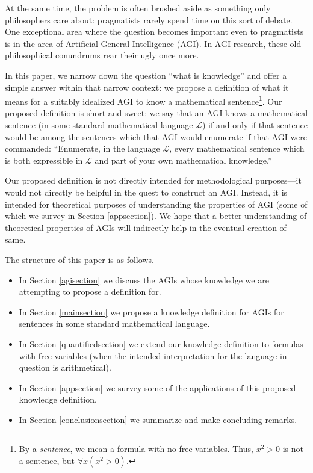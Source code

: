 \documentclass[runningheads]{llncs}
\begin{document}
At the same time, the problem is often brushed aside as something only
philosophers care about: pragmatists rarely spend time
on this sort of debate. One exceptional area where the question becomes
important even to pragmatists is in the area of Artificial General Intelligence
(AGI). In AGI research, these old philosophical conundrums rear their ugly
once more.

In this paper, we narrow down the question ``what is knowledge'' and offer
a simple answer within that narrow context:
we propose a definition of what it means for a suitably idealized AGI to know
a mathematical sentence\footnote{By a \emph{sentence}, we mean a formula with
no free variables. Thus, $x^2>0$ is not a sentence, but
$\forall x (x^2>0)$.}. Our proposed definition is short and
sweet: we say that
an AGI knows a mathematical sentence (in some standard mathematical language $\mathscr L$)
if and only if that sentence would be among the sentences which that AGI would
enumerate if that AGI were commanded:
``Enumerate, in the language $\mathscr L$, every mathematical sentence which
is both expressible in $\mathscr L$ and part of your own mathematical knowledge.''

Our proposed definition is not directly intended
for methodological purposes---it would not
directly be helpful in the quest to construct an AGI. Instead, it is intended for
theoretical purposes of understanding the properties of AGI (some of which
we survey in Section \ref{appsection}). We hope that a better
understanding of theoretical properties of AGIs will indirectly help in the eventual
creation of same.

The structure of this paper is as follows.
\begin{itemize}
  \item In Section \ref{agisection} we discuss the AGIs whose knowledge we are
  attempting to propose a definition for.
  \item In Section \ref{mainsection} we propose a knowledge definition for
  AGIs for sentences in some standard mathematical language.
  \item In Section \ref{quantifiedsection} we extend our knowledge definition
  to formulas with free variables (when the intended interpretation for the
  language in question is arithmetical).
  \item In Section \ref{appsection} we survey some of the applications of
  this proposed knowledge definition.
  \item In Section \ref{conclusionsection} we summarize and make concluding remarks.
\end{itemize}
\end{document}
